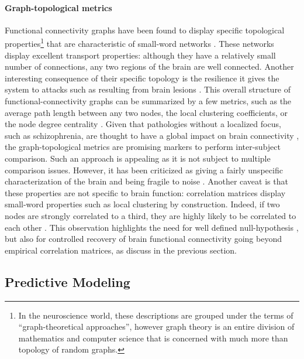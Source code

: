 \documentclass[5p]{elsarticle}
\begin{document}
\paragraph{Graph-topological metrics}
%
Functional connectivity graphs have been found to display specific
topological properties\footnote{In the neuroscience world, these
descriptions are grouped under the terms of ``graph-theoretical
approaches'', however graph theory is an entire division of mathematics
and computer science that is concerned with much more than topology of
random graphs.} that are characteristic of small-word networks
\cite{stam2004,salvador2005,achard2006,bullmore2009}. These networks
display excellent transport properties: although they have a relatively
small number of connections, any two regions of the brain are well
connected. 
Another interesting consequence of their specific topology is
the resilience it gives the system to attacks such as resulting from
brain lesions \cite{achard2006}. This overall structure of
functional-connectivity graphs can be summarized by a few metrics, such
as the average path length between any two nodes, the local clustering
coefficients, or the node degree centrality \cite{rubinov2010}. Given that pathologies without a
localized focus, such
as schizophrenia, are thought to have a global impact on brain
connectivity \cite{liu2008,bassett2008}, the graph-topological metrics are
promising markers to perform inter-subject comparison. Such an
approach is appealing as it is not subject to multiple comparison issues.
However, it has been criticized as giving a fairly unspecific
characterization of the brain and being fragile to noise
\cite{ioannides2007}. Another caveat is that these properties are not
specific to brain function: correlation matrices display
small-word properties such as local clustering by construction. Indeed, if two
nodes are strongly correlated to a third, they are highly likely to be
correlated to each other \cite{zalesky2012}. This observation highlights
the need for well defined null-hypothesis \cite{zalesky2012,rubinov2011},
but also for controlled recovery of brain functional connectivity going
beyond empirical correlation matrices, as discuss in the previous section.


\subsection{Predictive Modeling}
\end{document}
